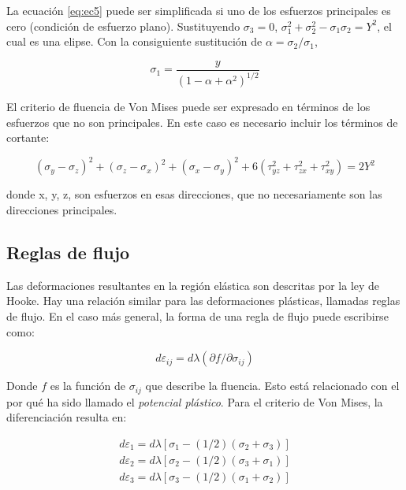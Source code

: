 La ecuación \ref{eq:ec5} puede ser simplificada si uno de los esfuerzos principales es cero (condición de esfuerzo plano). 
Sustituyendo $\sigma_3 = 0$, $\sigma_1^2 + \sigma_2^2 - \sigma_1 \sigma_2 = Y^2$, el cual es una elipse. Con la 
consiguiente sustitución de $\alpha = \sigma_2/\sigma_1$,

\begin{equation}
\sigma_1 = \frac{y}{(1-\alpha+\alpha^2)^{1/2}}
\end{equation}

El criterio de fluencia de Von Mises puede ser expresado en términos de los esfuerzos que no son principales. 
En este caso es necesario incluir los términos de cortante:

\begin{equation}
(\sigma_y - \sigma_z)^2 + (\sigma_z - \sigma_x)^2 + (\sigma_x - \sigma_y)^2 + 6 (\tau_{yz}^2 + \tau_{zx}^2 + \tau_{xy}^2) = 2Y^2
\end{equation}

donde x, y, z, son esfuerzos en esas direcciones, que no necesariamente son las direcciones principales.


\subsection{Reglas de flujo}

Las deformaciones resultantes en la región elástica son descritas por la ley de Hooke. 
Hay una relación similar para las deformaciones plásticas, llamadas reglas de flujo. 
En el caso más general, la forma de una regla de flujo puede escribirse como: ~\cite{hosford2007}

\begin{equation}
d\varepsilon_{ij} = d\lambda (\partial f / \partial \sigma_{ij})
\end{equation}

Donde $f$ es la función de $\sigma_{ij}$ que describe la fluencia. Esto está relacionado 
con el por qué ha sido llamado el \textit{potencial plástico}. Para el criterio de 
Von Mises, la diferenciación resulta en: ~\cite{hosford2007}

\begin{align}
d\varepsilon_1 = d\lambda \left[ \sigma_1 - (1/2) (\sigma_2 + \sigma_3) \right] \\
d\varepsilon_2 = d\lambda \left[ \sigma_2 - (1/2) (\sigma_3 + \sigma_1) \right] \\
d\varepsilon_3 = d\lambda \left[ \sigma_3 - (1/2) (\sigma_1 + \sigma_2) \right]
\end{align}

